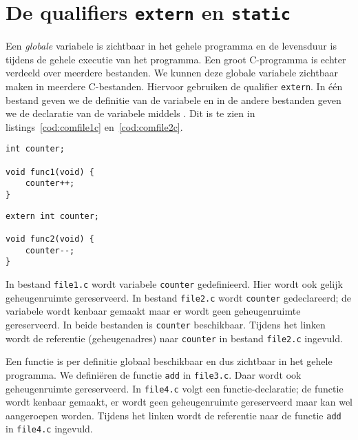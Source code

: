 \section{De qualifiers \texttt{extern} en \texttt{static}}
Een \textsl{globale} variabele is zichtbaar in het gehele programma en de levensduur is tijdens de gehele executie van het programma. Een groot C-programma is echter verdeeld over meerdere bestanden. We kunnen deze globale variabele zichtbaar maken in meerdere C-bestanden. Hiervoor gebruiken de qualifier \texttt{extern}. In één bestand geven we de definitie van de variabele en in de andere bestanden geven we de declaratie van de variabele middels . Dit is te zien in listings~\ref{cod:comfile1c} en~\ref{cod:comfile2c}.

\begin{minipage}[c]{0.45\textwidth}
\begin{lstlisting}[caption=\texttt{file1.c},label=cod:comfile1c]
int counter;

void func1(void) {
    counter++;
}
\end{lstlisting}
\end{minipage}\hfill%
\begin{minipage}[c]{0.45\textwidth}
\begin{lstlisting}[caption=\texttt{file2.c},label=cod:comfile2c]
extern int counter;

void func2(void) {
    counter--;
}
\end{lstlisting}
\end{minipage}

In bestand \texttt{file1.c} wordt variabele \texttt{counter} gedefinieerd. Hier wordt ook gelijk geheugenruimte gereserveerd. In bestand \texttt{file2.c} wordt \texttt{counter} gedeclareerd; de variabele wordt kenbaar gemaakt maar er wordt geen geheugenruimte gereserveerd. In beide bestanden is \texttt{counter} beschikbaar. Tijdens het linken wordt de referentie (geheugenadres) naar \texttt{counter} in bestand \texttt{file2.c} ingevuld.

Een functie is per definitie globaal beschikbaar en dus zichtbaar in het gehele programma. We definiëren de functie \texttt{add} in \texttt{file3.c}. Daar wordt ook geheugenruimte gereserveerd. In \texttt{file4.c} volgt een functie-declaratie; de functie wordt kenbaar gemaakt, er wordt geen geheugenruimte gereserveerd maar kan wel aangeroepen worden. Tijdens het linken wordt de referentie naar de functie \texttt{add} in \texttt{file4.c} ingevuld.


